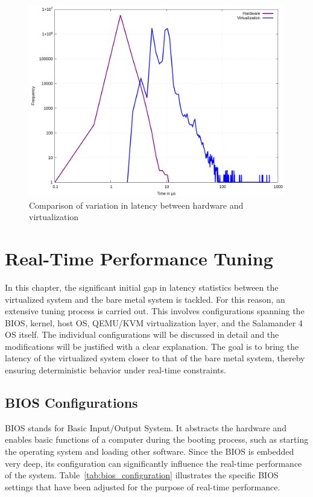\documentclass[MMR,Master,english]{twbook}
\begin{document}
\begin{figure}[H]
	\centering
	\includegraphics[width=0.7\columnwidth]{masterthesis-documentation/docs/sigmatek/xenomai/01combined/gnuplot_combined_max_latency.png}
	\caption[Comparison of variation in latency between hardware and virtualization]{Comparison of variation in latency between hardware and virtualization}
	\label{fig:gnuplot_max_latency_combined}
\end{figure}



\clearpage

\chapter{Real-Time Performance Tuning}\label{cha:real-time_tuning}

In this chapter, the significant initial gap in latency statistics between the virtualized system and the bare metal system is tackled. For this reason, an extensive tuning process is carried out. This involves configurations spanning the BIOS, kernel, host OS, QEMU/KVM virtualization layer, and the Salamander 4 OS itself. The individual configurations will be discussed in detail and the modifications will be justified with a clear explanation. The goal is to bring the latency of the virtualized system closer to that of the bare metal system, thereby ensuring deterministic behavior under real-time constraints.

\section{BIOS Configurations}\label{sec:bios_configurations}

BIOS stands for Basic Input/Output System. It abstracts the hardware and enables basic functions of a computer during the booting process, such as starting the operating system and loading other software. Since the BIOS is embedded very deep, its configuration can significantly influence the real-time performance of the system. Table~\ref{tab:bios_configuration} illustrates the specific BIOS settings that have been adjusted for the purpose of real-time performance. 
\end{document}
